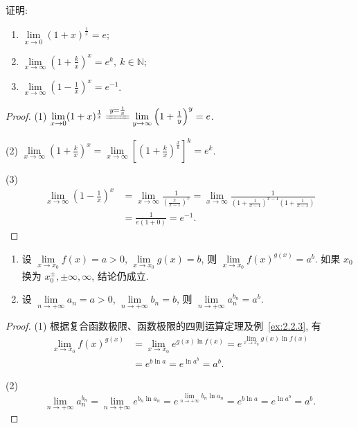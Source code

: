 \begin{example}\label{ex:2.2.11}
证明:
\begin{enumerate}[label=(\arabic*)]
  \item $\lim\limits_{x\to 0}(1+x)^{\frac{1}{x}}=e$;
  \item $\lim\limits_{x \to \infty} \left(1 + \frac{k}{x}\right)^x = e^k,\ k \in \mathbb{N}$;
  \item $\lim\limits_{x \to \infty} \left(1 - \frac{1}{x}\right)^x = e^{-1}$.
\end{enumerate}
\end{example}

\begin{proof}
(1) $\lim\limits_{x\to 0}(1+x)^{\frac{1}{x}} \xlongequal{y = \frac{1}{x}} \lim\limits_{y \to \infty} \left(1 + \frac{1}{y}\right)^{y} = e$.

(2) $\lim\limits_{x \to \infty} \left(1 + \frac{k}{x}\right)^x = \lim\limits_{x \to \infty} \left[\left(1 + \frac{k}{x}\right)^{\frac{x}{k}}\right]^k = e^k$.

(3) 
\begin{align*}
\lim_{x\to\infty}\left(1-\frac{1}{x}\right)^{x} &= \lim_{x\to\infty}\frac{1}{\left(\frac{x}{x-1}\right)^{x}} = \lim_{x\to\infty}\frac{1}{\left(1+\frac{1}{x-1}\right)^{x-1}\left(1+\frac{1}{x-1}\right)} \\
&= \frac{1}{e(1+0)}=e^{-1}.
\end{align*}
\end{proof}

\begin{theorem}\label{thm:2.2.8}
\begin{enumerate}[label=(\arabic*)]
  \item 设 $\lim\limits_{x \to x_0} f(x) = a > 0$, $\lim\limits_{x \to x_0} g(x) = b$, 则 $\lim\limits_{x \to x_0} f(x)^{g(x)} = a^b$. 如果 $x_0$ 换为 $x_0^\pm, \pm \infty, \infty$, 结论仍成立.
  \item 设 $\lim\limits_{n\to+\infty}a_n=a>0$, $\lim\limits_{n\to+\infty}b_n=b$, 则 $\lim\limits_{n\to+\infty}a_n^{b_n}=a^b$.
\end{enumerate}
\end{theorem}

\begin{proof}
(1) 根据复合函数极限、函数极限的四则运算定理及例~\ref{ex:2.2.3}, 有
\begin{align*}
\lim_{x\to x_{0}}f(x)^{g(x)} &= \lim_{x\to x_{0}}e^{g(x)\ln f(x)} = e^{\lim\limits_{x\to x_{0}}g(x)\ln f(x)} \\
&= e^{b\ln a} = e^{\ln a^{b}} = a^{b}.
\end{align*}

(2)
\[
\lim_{n\to+\infty}a_{n}^{b_{n}} = \lim_{n\to+\infty}e^{b_{n}\ln a_{n}} = e^{\lim\limits_{n\to+\infty} b_{n}\ln a_{n}} = e^{b\ln a}=e^{\ln a^{b}}=a^{b}.
\]
\end{proof}

